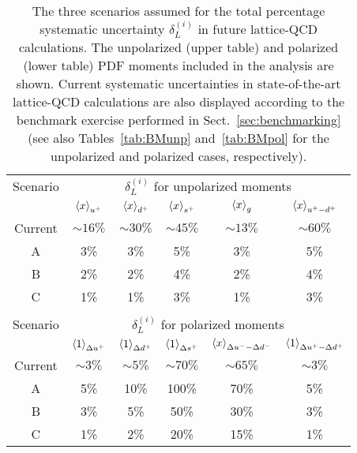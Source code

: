 \begin{table}[!t]
\centering
\footnotesize
\renewcommand{\arraystretch}{1.3} 
\begin{tabular}{cccccc}
\toprule
Scenario &  \multicolumn{5}{c}{$\delta_L^{(i)}$ for unpolarized moments} \\
& $\left\langle x\right\rangle_{u^+}$ 
& $\left\langle x\right\rangle_{d^+}$ 
& $\left\langle x\right\rangle_{s^+}$  
& $\left\langle x\right\rangle_{g}$  
&   $\left\langle x\right\rangle_{u^+-d^+}$  \\
\midrule
Current  
& $\sim 16\%$  
& $\sim 30\%$ 
& $\sim 45\%$  
& $\sim 13\%$  
& $\sim 60\%$ \\
A   & 3\%  & 3\% &  5\% &  3\% &  5\% \\
B   & 2\%  & 2\% &  4\% &  2\% &  4\%  \\
C   & 1\%  & 1\% &  3\% &  1\% &  3\%  \\
\bottomrule
\\
\toprule
Scenario & \multicolumn{5}{c}{$\delta_L^{(i)}$ for polarized moments} \\ 
& $\left\langle 1\right\rangle_{\Delta u^+}$  
& $\left\langle 1\right\rangle_{\Delta d^+}$  
& $\left\langle 1\right\rangle_{\Delta s^+}$
& $\left\langle x\right\rangle_{\Delta u^--\Delta d^-}$  
& $\left\langle 1\right\rangle_{\Delta u^+ - \Delta d^+}$\\
\midrule
Current  
& $\sim 3\%$  
& $\sim 5\%$ 
& $\sim 70\%$ 
& $\sim 65\%$ 
& $\sim 3\%$ \\
A   & 5\% & 10\%  & 100\% & 70\%  & 5\% \\
B   & 3\% &  5\%  &  50\% & 30\%  & 3\% \\
C   & 1\% &  2\%  &  20\% & 15\%  & 1\% \\
\bottomrule
\end{tabular}
\caption{\small The three scenarios assumed for the total percentage
systematic uncertainty $\delta_L^{(i)}$ in future lattice-QCD calculations.
%
The unpolarized (upper table) and polarized (lower table) PDF moments
included in the analysis are shown.
%
Current systematic uncertainties in state-of-the-art lattice-QCD calculations
are also displayed according to the benchmark exercise performed in
Sect.~\ref{sec:benchmarking} (see also Tables~\ref{tab:BMunp} 
and~\ref{tab:BMpol} for the unpolarized and polarized cases, respectively).
\label{tab:scenarios}
}
\end{table}

